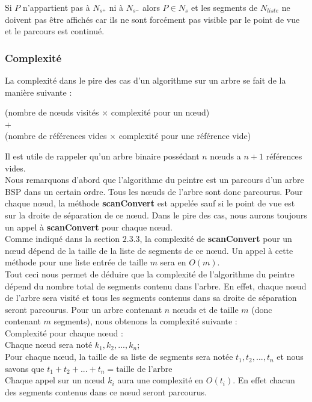 \documentclass[11pt,a4paper]{article}
\theoremstyle{definition}
\theoremstyle{remark}
\begin{document}
Si $P$ n'appartient pas à $N_{s^+}$ ni à $N_{s^-}$ alors $P \in N_s$ et les segments de $N_{liste}$ ne doivent pas être affichés car ils ne sont forcément pas visible par le point de vue et le parcours est continué.

\subsubsection{Complexité}
La complexité dans le pire des cas d'un algorithme sur un arbre se fait de la manière suivante :
\begin{center}
(nombre de nœuds visités $\times$ complexité pour un nœud) \\
$+$ \\
(nombre de références vides $\times$ complexité pour une référence vide)
\end{center}
Il est utile de rappeler qu'un arbre binaire possédant $n$ nœuds a $n+1$ références vides.\\

Nous remarquons d'abord que l'algorithme du peintre est un parcours d'un arbre BSP dans un certain ordre. Tous les nœuds de l'arbre sont donc parcourus. Pour chaque nœud, la méthode \textbf{scanConvert} est appelée sauf si le point de vue est sur la droite de séparation de ce nœud. Dans le pire des cas, nous aurons toujours un appel à \textbf{scanConvert} pour chaque nœud.\\

Comme indiqué dans la section $2.3.3$, la complexité de \textbf{scanConvert} pour un nœud dépend de la taille de la liste de segments de ce nœud. Un appel à cette méthode pour une liste entrée de taille $m$ sera en $O(m)$. \\

Tout ceci nous permet de déduire que la complexité de l'algorithme du peintre dépend du nombre total de segments contenu dans l'arbre. En effet, chaque nœud de l'arbre sera visité et tous les segments contenus dans sa droite de séparation seront parcourus. Pour un arbre contenant $n$ nœuds et de taille $m$ (donc contenant $m$ segments), nous obtenons la complexité suivante :\\

Complexité pour chaque nœud :\\
Chaque nœud sera noté $k_1, k_2, ... , k_n$;\\
Pour chaque nœud, la taille de sa liste de segments sera notée $t_1, t_2, ... , t_n$ et nous savons que $t_1 + t_2 + ... + t_n = \text{taille de l'arbre}$\\
Chaque appel sur un nœud $k_i$ aura une complexité en $O(t_i)$. En effet chacun des segments contenus dans ce nœud seront parcourus.
\end{document}
